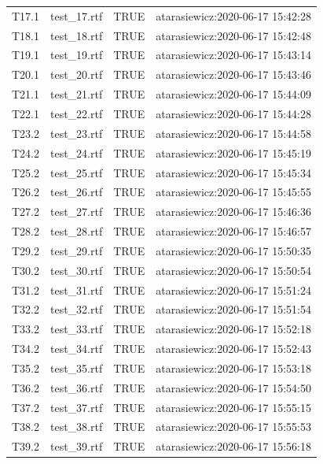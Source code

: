 \documentclass[]{article}
\begin{document}
\begin{longtable}{llll}
T17.1 & test\_17.rtf & TRUE & atarasiewicz:2020-06-17 15:42:28\\
\addlinespace
\rowcolor{gray!6}  T18.1 & test\_18.rtf & TRUE & atarasiewicz:2020-06-17 15:42:48\\
T19.1 & test\_19.rtf & TRUE & atarasiewicz:2020-06-17 15:43:14\\
\rowcolor{gray!6}  T20.1 & test\_20.rtf & TRUE & atarasiewicz:2020-06-17 15:43:46\\
T21.1 & test\_21.rtf & TRUE & atarasiewicz:2020-06-17 15:44:09\\
\rowcolor{gray!6}  T22.1 & test\_22.rtf & TRUE & atarasiewicz:2020-06-17 15:44:28\\
\addlinespace
T23.2 & test\_23.rtf & TRUE & atarasiewicz:2020-06-17 15:44:58\\
\rowcolor{gray!6}  T24.2 & test\_24.rtf & TRUE & atarasiewicz:2020-06-17 15:45:19\\
T25.2 & test\_25.rtf & TRUE & atarasiewicz:2020-06-17 15:45:34\\
\rowcolor{gray!6}  T26.2 & test\_26.rtf & TRUE & atarasiewicz:2020-06-17 15:45:55\\
T27.2 & test\_27.rtf & TRUE & atarasiewicz:2020-06-17 15:46:36\\
\addlinespace
\rowcolor{gray!6}  T28.2 & test\_28.rtf & TRUE & atarasiewicz:2020-06-17 15:46:57\\
T29.2 & test\_29.rtf & TRUE & atarasiewicz:2020-06-17 15:50:35\\
\rowcolor{gray!6}  T30.2 & test\_30.rtf & TRUE & atarasiewicz:2020-06-17 15:50:54\\
T31.2 & test\_31.rtf & TRUE & atarasiewicz:2020-06-17 15:51:24\\
\rowcolor{gray!6}  T32.2 & test\_32.rtf & TRUE & atarasiewicz:2020-06-17 15:51:54\\
\addlinespace
T33.2 & test\_33.rtf & TRUE & atarasiewicz:2020-06-17 15:52:18\\
\rowcolor{gray!6}  T34.2 & test\_34.rtf & TRUE & atarasiewicz:2020-06-17 15:52:43\\
T35.2 & test\_35.rtf & TRUE & atarasiewicz:2020-06-17 15:53:18\\
\rowcolor{gray!6}  T36.2 & test\_36.rtf & TRUE & atarasiewicz:2020-06-17 15:54:50\\
T37.2 & test\_37.rtf & TRUE & atarasiewicz:2020-06-17 15:55:15\\
\addlinespace
\rowcolor{gray!6}  T38.2 & test\_38.rtf & TRUE & atarasiewicz:2020-06-17 15:55:53\\
T39.2 & test\_39.rtf & TRUE & atarasiewicz:2020-06-17 15:56:18\\

\end{longtable}
\end{document}
